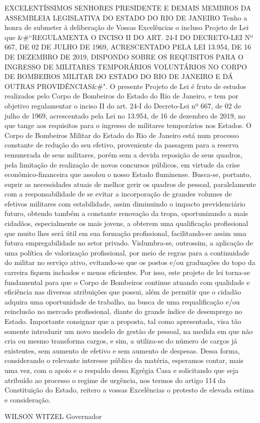 \documentclass[10pt]{article}
\begin{document}
EXCELENTÍSSIMOS SENHORES PRESIDENTE E DEMAIS MEMBROS DA ASSEMBLEIA LEGISLATIVA DO ESTADO DO RIO DE JANEIRO
Tenho a honra de submeter à deliberação de Vossas Excelências o incluso Projeto de Lei que &#``REGULAMENTA O INCISO II DO ART. 24-I DO DECRETO-LEI Nº 667, DE 02 DE JULHO DE 1969, ACRESCENTADO PELA LEI 13.954, DE 16 DE DEZEMBRO DE 2019, DISPONDO SOBRE OS REQUISITOS PARA O INGRESSO DE MILITARES TEMPORÁRIOS VOLUNTÁRIOS NO CORPO DE BOMBEIROS MILITAR DO ESTADO DO RIO DE JANEIRO E DÁ OUTRAS PROVIDÊNCIAS&#".
O presente Projeto de Lei é fruto de estudos realizados pelo Corpo de Bombeiros do Estado do Rio de Janeiro, e tem por objetivo regulamentar o inciso II do art. 24-I do Decreto-Lei nº 667, de 02 de julho de 1969, acrescentado pela Lei no 13.954, de 16 de dezembro de 2019, no que tange aos requisitos para o ingresso de militares temporários nos Estados.
O Corpo de Bombeiros Militar do Estado do Rio de Janeiro está num processo constante de redução do seu efetivo, proveniente da passagem para a reserva remunerada de seus militares, porém sem a devida reposição de seus quadros, pela limitação de realização de novos concursos públicos, em virtude da crise econômico-financeira que assolou o nosso Estado fluminense.
Busca-se, portanto, suprir as necessidades atuais de melhor gerir os quadros de pessoal, paralelamente com a responsabilidade de se evitar a incorporação de grandes volumes de efetivos militares com estabilidade, assim diminuindo o impacto previdenciário futuro, obtendo também a constante renovação da tropa, oportunizando a mais cidadãos, especialmente os mais jovens, a obterem uma qualificação profissional que muito lhes será útil em sua formação profissional, facilitando-se assim uma futura empregabilidade no setor privado. 
Vislumbra-se, outrossim, a aplicação de uma política de valorização profissional, por meio de regras para a continuidade do militar no serviço ativo, evitando-se que os postos e/ou graduações do topo da carreira fiquem inchados e menos eficientes.  
Por isso, este projeto de lei torna-se fundamental para que o Corpo de Bombeiros continue atuando com qualidade e eficiência nas diversas atribuições que possui, além de permitir que o cidadão adquira uma oportunidade de trabalho, na busca de uma requalificação e/ou reinclusão no mercado profissional, diante do grande índice de desemprego no Estado.
Importante consignar que a proposta, tal como apresentada, visa tão somente introduzir um novo modelo de gestão de pessoal, na medida em que não cria ou mesmo transforma cargos, e sim, a utiliza-se do número de cargos já existentes, sem aumento de efetivo e sem aumento de despesas.
Dessa forma, considerando o relevante interesse público da matéria, esperamos contar, mais uma vez, com o apoio e o respaldo dessa Egrégia Casa e solicitando que seja atribuído ao processo o regime de urgência, nos termos do artigo 114 da Constituição do Estado, reitero a vossas Excelências o protesto de elevada estima e consideração.  

WILSON WITZEL
Governador



\iffalse
\begin{center}
  \textbf{REFERÊNCIAS}
\end{center}


\fi
\end{document}
